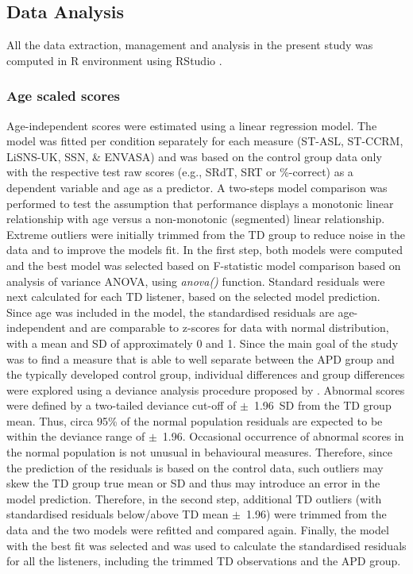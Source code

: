 \documentclass[a4paper, twoside]{templates/ociamthesis}
\begin{document}
\hypertarget{data-analysis}{%
\subsection{Data Analysis}\label{data-analysis}}

All the data extraction, management and analysis in the present study was computed in R environment \autocite[Version 4.0.3;][]{RCore} using RStudio \autocite[Version 1.4.938;][]{RStudio}.\\

\hypertarget{z-scores}{%
\subsubsection{Age scaled scores}\label{z-scores}}

Age-independent scores were estimated using a linear regression model. The model was fitted per condition separately for each measure (ST-ASL, ST-CCRM, LiSNS-UK, SSN, \& ENVASA) and was based on the control group data only with the respective test raw scores (e.g., SRdT, SRT or \%-correct) as a dependent variable and age as a predictor. A two-steps model comparison was performed to test the assumption that performance displays a monotonic linear relationship with age versus a non-monotonic (segmented) linear relationship. Extreme outliers were initially trimmed from the TD group to reduce noise in the data and to improve the models fit. In the first step, both models were computed and the best model was selected based on F-statistic model comparison based on analysis of variance ANOVA, using \emph{anova()} function. Standard residuals were next calculated for each TD listener, based on the selected model prediction. Since age was included in the model, the standardised residuals are age-independent and are comparable to z-scores for data with normal distribution, with a mean and SD of approximately 0 and 1. Since the main goal of the study was to find a measure that is able to well separate between the APD group and the typically developed control group, individual differences and group differences were explored using a deviance analysis procedure proposed by \textcite{Ramus2003}. Abnormal scores were defined by a two-tailed deviance cut-off of \(\pm\)~1.96~SD from the TD group mean. Thus, circa 95\% of the normal population residuals are expected to be within the deviance range of \(\pm\)~1.96. Occasional occurrence of abnormal scores in the normal population is not unusual in behavioural measures. Therefore, since the prediction of the residuals is based on the control data, such outliers may skew the TD group true mean or SD and thus may introduce an error in the model prediction. Therefore, in the second step, additional TD outliers (with standardised residuals below/above TD mean \(\pm\)~1.96) were trimmed from the data and the two models were refitted and compared again. Finally, the model with the best fit was selected and was used to calculate the standardised residuals for all the listeners, including the trimmed TD observations and the APD group.
\end{document}

